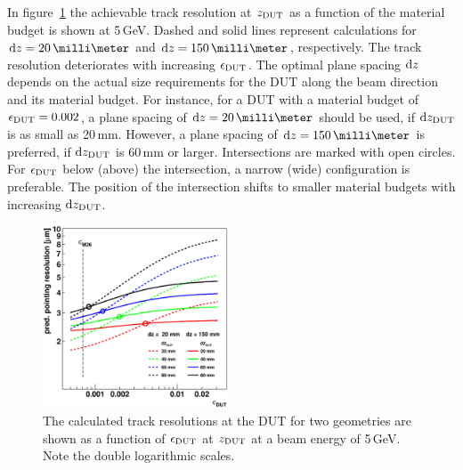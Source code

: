 In figure~\ref{fig:CalcResoP_DUT} the achievable track resolution at $z_{\textrm{DUT}}$ as a function of the material budget is shown at 5\,GeV.
Dashed and solid lines represent calculations for $\dz = 20\,\milli\meter$ and $\dz = 150\,\milli\meter$, respectively. 
The track resolution deteriorates with increasing $\mathnormal{\epsilon_{\textrm{DUT}}}$. 
The optimal plane spacing $\textrm{d}z$ depends on the actual size requirements for the DUT along the beam direction and its material budget.
For instance, for a DUT with a material budget of $\mathnormal{\epsilon_{\textrm{DUT}}} = 0.002$, a plane spacing of $\dz = 20\,\milli\meter$ should be used, if $\textrm{d}z_{\textrm{DUT}}$ is as small as 20\,mm. 
However, a plane spacing of $\dz = 150\,\milli\meter$ is preferred, if $\textrm{d}z_{\textrm{DUT}}$ is 60\,mm or larger. 
Intersections are marked with open circles. 
For $\mathnormal{\epsilon_{\textrm{DUT}}}$ below (above) the intersection, a narrow (wide) configuration is preferable. 
The position of the intersection shifts to smaller material budgets with increasing $\textrm{d}z_{\textrm{DUT}}$. 

\begin{figure}[tbp]
  \centering
  \includegraphics[width=0.49\textwidth]{figures/CalcResoVsEpsdut} %
   \caption[Track resolution as a function of the beam energy]{
   The calculated track resolutions at the DUT for two geometries are shown as a function of $\mathnormal{\epsilon_{\textrm{DUT}}}$ at $z_{\textrm{DUT}}$ at a beam energy of 5\,GeV. 
   Note the double logarithmic scales. 
   }
 \label{fig:CalcResoP_DUT}
\end{figure}


